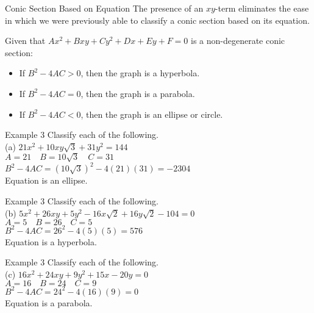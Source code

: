 \documentclass[t,usenames,dvipsnames]{beamer}
\begin{document}
\begin{frame}{Conic Section Based on Equation}
The presence of an $xy$-term eliminates the ease in which we were previously able to classify a conic section based on its equation. \newline\\  \pause

Given that $Ax^2 + Bxy + Cy^2 + Dx + Ey + F = 0$ is a non-degenerate conic section:    \newline\\  \pause
\begin{itemize}
    \item If $B^2 - 4AC > 0$, then the graph is a hyperbola.    \newline\\  \pause
    \item If $B^2 - 4AC = 0$, then the graph is a parabola.    \newline\\  \pause
    \item If $B^2 - 4AC < 0$, then the graph is an ellipse or circle.
\end{itemize}
\end{frame}

\begin{frame}{Example 3}
Classify each of the following. \newline\\
(a) \quad   $21x^2 + 10xy\sqrt{3} + 31y^2 = 144$    \newline\\  \pause
$A = 21 \quad B = 10\sqrt{3} \quad C = 31$  \newline\\  \pause
$B^2 - 4AC = (10\sqrt{3})^2 - 4(21)(31) = -2304$    \newline\\  \pause
Equation is an ellipse.
\end{frame}

\begin{frame}{Example 3}
Classify each of the following. \newline\\
(b) \quad   $5x^2 + 26xy + 5y^2 - 16x\sqrt{2} + 16y\sqrt{2} - 104 = 0$  \newline\\  \pause
$A = 5 \quad B = 26 \quad C = 5$        \newline\\  \pause
$B^2-4AC = 26^2 - 4(5)(5) = 576$        \newline\\  \pause
Equation is a hyperbola.
\end{frame}

\begin{frame}{Example 3}
Classify each of the following. \newline\\
(c) \quad   $16x^2 + 24xy + 9y^2 + 15x - 20y = 0$    \newline\\  \pause
$A = 16 \quad B = 24 \quad C = 9$    \newline\\  \pause
$B^2 - 4AC = 24^2 - 4(16)(9) = 0$    \newline\\  \pause
Equation is a parabola.
\end{frame}
\end{document}

